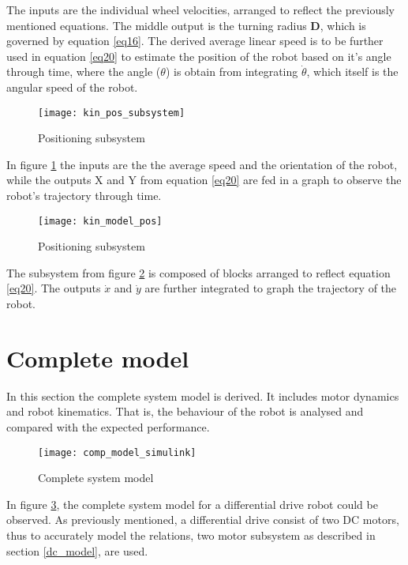 The inputs are the individual wheel velocities, arranged to reflect the previously mentioned equations. The middle output is the turning radius \textbf{D}, which is governed by equation \ref{eq16}. The derived average linear speed is to be further used in equation \ref{eq20} to estimate the position of the robot based on it's angle through time, where the angle ($\theta$) is   obtain from integrating $\dot{\theta}$, which itself is the angular speed of the robot. 

\begin{figure}[h]
\centering
\texttt{[image: kin\_pos\_subsystem]}
\caption{Positioning subsystem}
\label{fig::pos_sub}
\end{figure} 

In figure \ref{fig::pos_sub} the inputs are the the average speed and the orientation of the robot, while the outputs X and Y from equation \ref{eq20} are fed in a graph to observe the robot's trajectory through time. 

\begin{figure}[h]
\centering
\texttt{[image: kin\_model\_pos]}
\caption{Positioning subsystem}
\label{fig::pos_model}
\end{figure} 

The subsystem from figure \ref{fig::pos_model} is composed of blocks arranged to reflect equation \ref{eq20}. The outputs $\dot{x}$ and $\dot{y}$ are further integrated to graph the trajectory of the robot.

\section{Complete model}

In this section the complete system model is derived. It includes motor dynamics and robot kinematics. That is, the behaviour of the robot is analysed and compared with the expected performance.

\begin{figure}[h]
\centering
\texttt{[image: comp\_model\_simulink]}
\caption{Complete system model}
\label{fig::com_model}
\end{figure} 

In figure \ref{fig::com_model}, the complete system model for a differential drive robot could be observed. As previously mentioned, a differential drive consist of two DC motors, thus to accurately model the relations, two motor subsystem as described in section \ref{dc_model}, are used. 

